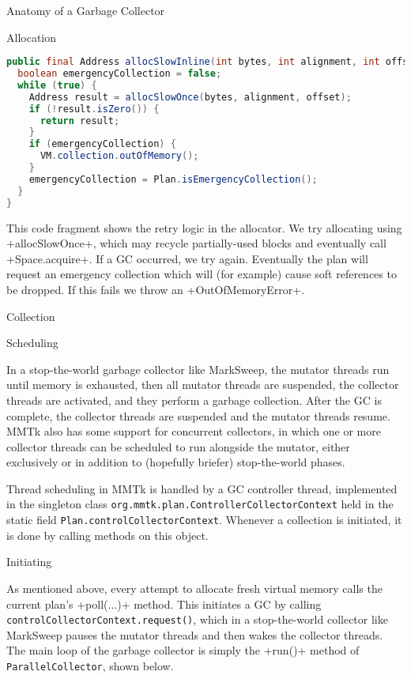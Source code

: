 \begin{section}{Anatomy of a Garbage Collector}
\begin{subsection}{Allocation}
\begin{lstlisting}[language=Java,title=Allocator.java (simplified)]
public final Address allocSlowInline(int bytes, int alignment, int offset) {
  boolean emergencyCollection = false;
  while (true) {
    Address result = allocSlowOnce(bytes, alignment, offset);
    if (!result.isZero()) {
      return result;
    }
    if (emergencyCollection) {
      VM.collection.outOfMemory();
    }
    emergencyCollection = Plan.isEmergencyCollection();
  }
}
\end{lstlisting}

This code fragment shows the retry logic in the allocator.  We try allocating using \spverb+allocSlowOnce+, which may recycle partially-used blocks and eventually call \spverb+Space.acquire+.  If a GC occurred, we try again.  Eventually the plan will request an emergency collection which will (for example) cause soft references to be dropped.  If this fails we throw an \spverb+OutOfMemoryError+.

\end{subsection}

\begin{subsection}{Collection}

\begin{subsubsection}{Scheduling}

In a stop-the-world garbage collector like MarkSweep, the mutator threads run until memory is exhausted, then all mutator threads are suspended, the collector threads are activated, and they perform a garbage collection.  After the GC is complete, the collector threads are suspended and the mutator threads resume.  MMTk also has some support for concurrent collectors, in which one or more collector threads can be scheduled to run alongside the mutator, either exclusively or in addition to (hopefully briefer) stop-the-world phases. 

Thread scheduling in MMTk is handled by a GC controller thread, implemented in the singleton class \texttt{org.mmtk.plan.ControllerCollectorContext} held in the static field \texttt{Plan.controlCollectorContext}. Whenever a collection is initiated, it is done by calling methods on this object.

\end{subsubsection}

\begin{subsubsection}{Initiating}

As mentioned above, every attempt to allocate fresh virtual memory calls the current plan's \spverb+poll(...)+ method.  This initiates a GC by calling \texttt{con\-trol\-Col\-lec\-tor\-Con\-text.re\-quest()}, which in a stop-the-world collector like MarkSweep pauses the mutator threads and then wakes the collector threads.  The main loop of the garbage collector is simply the \spverb+run()+ method of \texttt{ParallelCollector}, shown below.


\end{subsubsection}
\end{subsection}
\end{section}
